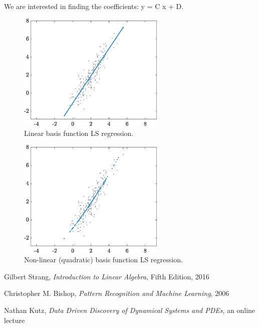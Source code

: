 \documentclass[10pt,twocolumn]{article}
\begin{document}
We are interested in finding the coefficients: y = C x + D.












\begin{figure}[H]
\centering\includegraphics[width=7cm]{LS-linear-basis-functions.eps}
\caption{Linear basis function LS regression.}
\label{fig:LS-linear-basis}
\end{figure}

\begin{figure}[H]
\centering\includegraphics[width=7cm]{LS-nonlinear-basis-functions.eps}
\caption{Non-linear (quadratic) basis function LS regression.}
\label{fig:LS-linear-basis}
\end{figure}











\newpage


\thebibliography{}



 Gilbert Strang, \textit{Introduction to Linear Algebra}, Fifth Edition, 2016

 Christopher M. Bishop, \textit{Pattern Recognition and Machine Learning}, 2006

 Nathan Kutz, \textit{Data Driven Discovery of Dynamical Systems and PDEs}, an online lecture 

 \label{bib:pope}
\end{document}
